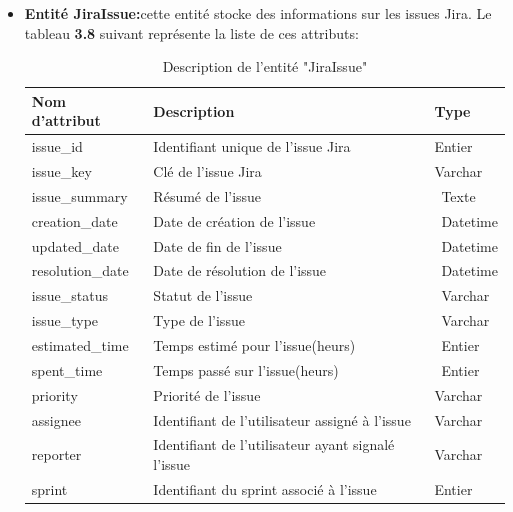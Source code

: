 \begin{itemize}
\begin{center}
\begin{longtable}{|p{3cm}|p{11cm}|p{2cm}|}
                \end{longtable}
        \end{center}
        \vspace{-1cm}
        \item \textbf{Entité JiraIssue:}cette entité stocke des informations sur les issues Jira.
        Le tableau \textbf{3.8} suivant représente la liste de ces attributs:
        \begin{center}   
                \begin{longtable}{|p{3cm}|p{11cm}|p{2cm}|}
                    \caption {Description de l'entité "JiraIssue"} \\
                    \hline
                    \rowcolor{blue!18}\textbf{\large{Nom d'attribut}} & \textbf{\large{Description}} & \textbf{\large{Type}} \\
                    \hline
                    issue\_id&   Identifiant unique de l'issue Jira&  Entier\\\hline
                    issue\_key&Clé de l'issue Jira& Varchar\\\hline
                    issue\_summary& Résumé de l'issue &\ Texte\\\hline
                    creation\_date& Date de création de l'issue&\ Datetime\\\hline
                    updated\_date& Date de fin de l'issue&\ Datetime\\\hline
                    resolution\_date&  Date de résolution de l'issue &\ Datetime\\\hline
                    issue\_status & Statut de l'issue &\ Varchar\\\hline
                    issue\_type & Type de l'issue&\ Varchar\\\hline
                    estimated\_time & Temps estimé pour l'issue(heurs)&\ Entier\\\hline
                    spent\_time &  Temps passé sur l'issue(heurs)&\ Entier\\\hline
                    priority&Priorité de l'issue&Varchar\\\hline
                    assignee&Identifiant de l'utilisateur assigné à l'issue&Varchar\\\hline
                    reporter& Identifiant de l'utilisateur ayant signalé l'issue &Varchar\\\hline
                    sprint&Identifiant du sprint associé à l'issue&Entier\\\hline
                                   


\end{longtable}
\end{center}
\end{itemize}
